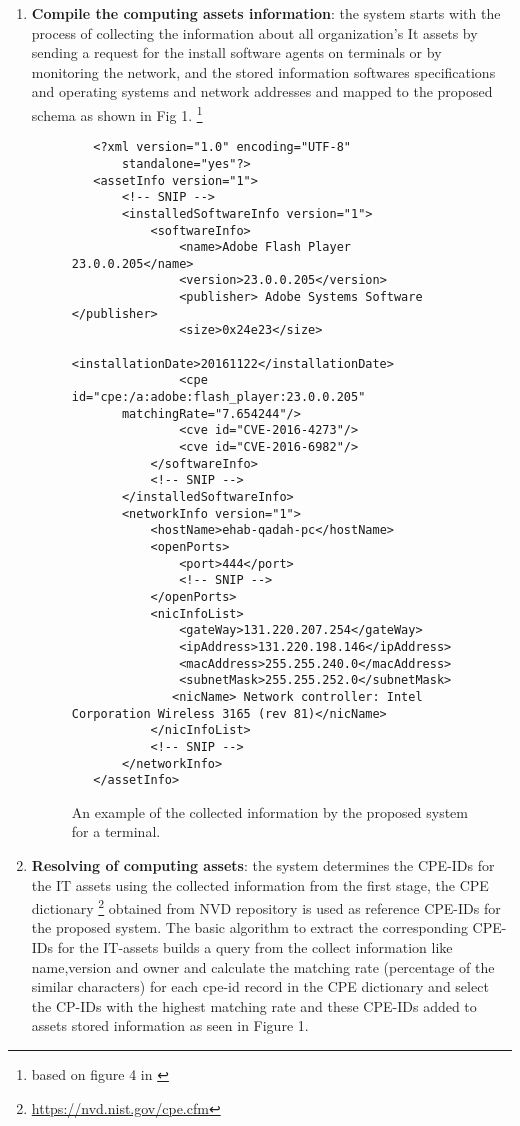 \documentclass{llncs}
\begin{document}
\begin{enumerate}
 \item \textbf{Compile the computing assets information}: the system starts with the process of collecting the information about all organization's It assets by sending a request for the install software agents on terminals or by monitoring the network, and the stored information softwares specifications and operating systems and network addresses and mapped to the proposed schema as shown in Fig 1.  \footnote{based on figure 4 in \cite{paper1}} 
 
 \begin{figure}
 \centering
   \lstset{language=XML}
    \begin{lstlisting}
   <?xml version="1.0" encoding="UTF-8"
       standalone="yes"?>
   <assetInfo version="1">
       <!-- SNIP -->
       <installedSoftwareInfo version="1">
           <softwareInfo>
               <name>Adobe Flash Player 23.0.0.205</name>
               <version>23.0.0.205</version>
               <publisher> Adobe Systems Software </publisher>
               <size>0x24e23</size>
               <installationDate>20161122</installationDate>
               <cpe id="cpe:/a:adobe:flash_player:23.0.0.205"
       matchingRate="7.654244"/>
               <cve id="CVE-2016-4273"/>
               <cve id="CVE-2016-6982"/>
           </softwareInfo>
           <!-- SNIP -->
       </installedSoftwareInfo>
       <networkInfo version="1">
           <hostName>ehab-qadah-pc</hostName>
           <openPorts>
               <port>444</port>
               <!-- SNIP -->
           </openPorts>
           <nicInfoList>
               <gateWay>131.220.207.254</gateWay>
               <ipAddress>131.220.198.146</ipAddress>
               <macAddress>255.255.240.0</macAddress>
               <subnetMask>255.255.252.0</subnetMask>
              <nicName> Network controller: Intel Corporation Wireless 3165 (rev 81)</nicName>
           </nicInfoList>
           <!-- SNIP -->
       </networkInfo>
   </assetInfo>
    \end{lstlisting}
   \caption{An example of the collected information by the proposed system for  a terminal.}
    \end{figure}
   
   \item \textbf{Resolving of computing assets}: the system determines the CPE-IDs for the IT assets using the collected information from the first stage, the CPE dictionary \footnote{\url{https://nvd.nist.gov/cpe.cfm}} obtained from NVD repository is used as reference CPE-IDs for the proposed system. The basic algorithm to extract the corresponding CPE-IDs for the IT-assets builds a query from the collect information like name,version and owner and calculate the matching rate (percentage of the similar characters) for each cpe-id record in the CPE dictionary and select the CP-IDs with the highest matching rate and these CPE-IDs added to assets stored information as seen in Figure 1.
   

\end{enumerate}
\end{document}
